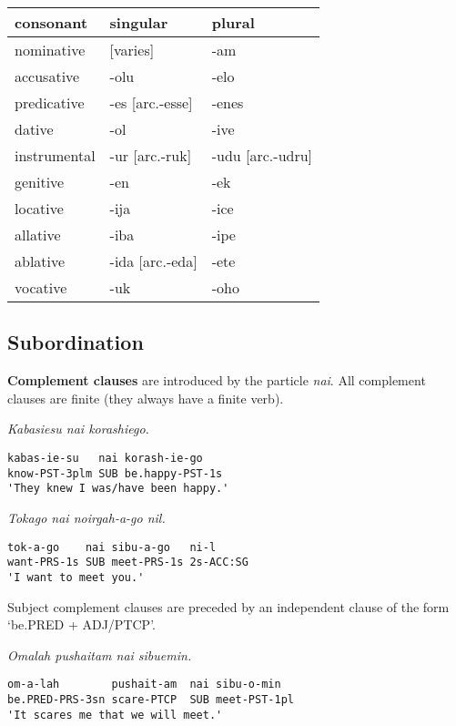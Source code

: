 \documentclass[
  a4paper,
]{article}
\begin{document}
\begin{longtable}[]{@{}lll@{}}
\toprule
consonant & singular & plural \\
\midrule
\endhead
nominative & {[}varies{]} & -am \\
accusative & -olu & -elo \\
predicative & -es {[}arc.-esse{]} & -enes \\
dative & -ol & -ive \\
instrumental & -ur {[}arc.-ruk{]} & -udu {[}arc.-udru{]} \\
genitive & -en & -ek \\
locative & -ija & -ice \\
allative & -iba & -ipe \\
ablative & -ida {[}arc.-eda{]} & -ete \\
vocative & -uk & -oho \\
\bottomrule
\end{longtable}

\hypertarget{subordination}{%
\subsection{Subordination}\label{subordination}}

\textbf{Complement clauses} are introduced by the particle \emph{nai}.
All complement clauses are finite (they always have a finite verb).

\emph{Kabasiesu nai korashiego.}

\begin{verbatim}
kabas-ie-su   nai korash-ie-go
know-PST-3plm SUB be.happy-PST-1s
'They knew I was/have been happy.'
\end{verbatim}

\emph{Tokago nai noirgah-a-go nil.}

\begin{verbatim}
tok-a-go    nai sibu-a-go   ni-l
want-PRS-1s SUB meet-PRS-1s 2s-ACC:SG
'I want to meet you.'
\end{verbatim}

Subject complement clauses are preceded by an independent clause of the
form `be.PRED + ADJ/PTCP'.

\emph{Omalah pushaitam nai sibuemin.}

\begin{verbatim}
om-a-lah        pushait-am  nai sibu-o-min
be.PRED-PRS-3sn scare-PTCP  SUB meet-PST-1pl
'It scares me that we will meet.'
\end{verbatim}
\end{document}
